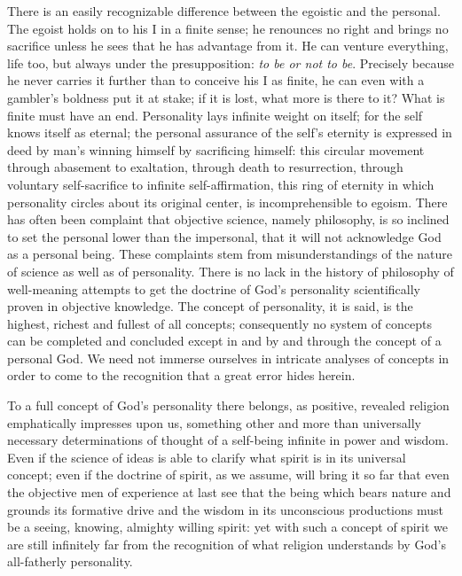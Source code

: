 \documentclass[12pt,a4paper,openany]{book}
\newcommand{\opage}[1]{\marginnote{\footnotesize\textit{[#1]}}}
\begin{document}
There is an easily recognizable difference between the egoistic and the personal. The egoist holds
on to his I in a finite sense; he renounces no right and brings no sacrifice unless he sees that he
has advantage from it. He can venture everything, life too, but always under the presupposition:
\emph{to be or not to be}. Precisely because he never carries it further than to conceive his I as
finite, he can even with a gambler's boldness put it at stake; if it is lost, what more is
\setcounter{footnote}{0}%
\opage{72}there to it? What is finite must have an end. Personality lays infinite weight on itself;
for the self knows itself as eternal; the personal assurance of the self's eternity is expressed in
deed by man's winning himself by sacrificing himself: this circular movement through abasement to
exaltation, through death to resurrection, through voluntary self-sacrifice to infinite
self-affirmation, this ring of eternity in which personality circles about its original center, is
incomprehensible to egoism. There has often been complaint that objective science, namely philosophy,
is so inclined to set the personal lower than the impersonal, that it will not acknowledge God as a
personal being. These complaints stem from misunderstandings of the nature of science as well as of
personality. There is no lack in the history of philosophy of well-meaning %
attempts to get the doctrine of God's personality scientifically proven in objective knowledge. The
concept of personality, it is said, is the highest, richest and fullest of all concepts; consequently
no system of concepts can be completed and concluded except in and by and through the concept of a
personal God. We need not immerse ourselves in intricate analyses of concepts in order to come to the
recognition that a great error hides herein.

To a full concept of God's personality there belongs, as positive, revealed religion emphatically
impresses upon us, something other and more than universally necessary determinations of thought of
a self-being infinite in power and wisdom. Even if the science of ideas is able to clarify what spirit
is in its universal concept; even if the doctrine of spirit, as we assume, will bring it so far that
even the objective men of experience at last see that
\setcounter{footnote}{0}%
\opage{73}the being which bears nature and grounds its formative drive and the wisdom in its
unconscious productions must be a seeing, knowing, almighty willing spirit: yet with such a concept of
spirit we are still infinitely far from the recognition of what religion understands by God's
all-fatherly personality.
\end{document}
